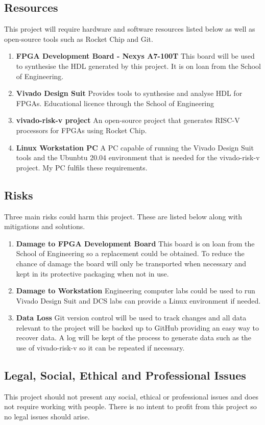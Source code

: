 \subsection{Resources}
This project will require hardware and software resources listed below as well as open-source tools such as Rocket Chip and Git.
\begin{enumerate}
	\item \textbf{FPGA Development Board - Nexys A7-100T} \newline
	This board will be used to synthesise the HDL generated by this project. It is on loan from the School of Engineering.
	\item \textbf{Vivado Design Suit} \newline
	Provides tools to synthesise and analyse HDL for FPGAs. Educational licence through the School of Engineering
	\item \textbf{vivado-risk-v project} \cite{vivado-risk-v} \newline
	An open-source project that generates RISC-V processors for FPGAs using Rocket Chip.
	\item \textbf{Linux Workstation PC} \newline
	A PC capable of running the Vivado Design Suit tools and the Ubunbtu 20.04 environment that is needed for the vivado-risk-v project. My PC fulfils these requirements.
\end{enumerate}

\subsection{Risks}
Three main risks could harm this project. These are listed below along with mitigations and solutions.
\begin{enumerate}
	\item \textbf{Damage to FPGA Development Board} \newline
	This board is on loan from the School of Engineering so a replacement could be obtained. To reduce the chance of damage the board will only be transported when necessary and kept in its protective packaging when not in use.
	\item \textbf{Damage to Workstation} \newline
	Engineering computer labs could be used to run Vivado Design Suit and DCS labs can provide a Linux environment if needed.
	\item \textbf{Data Loss} \newline
	Git version control will be used to track changes and all data relevant to the project will be backed up to GitHub providing an easy way to recover data. A log will be kept of the process to generate data such as the use of vivado-risk-v so it can be repeated if necessary.
\end{enumerate}

\subsection{Legal, Social, Ethical and Professional Issues}
This project should not present any social, ethical or professional issues and does not require working with people. There is no intent to profit from this project so no legal issues should arise. 
